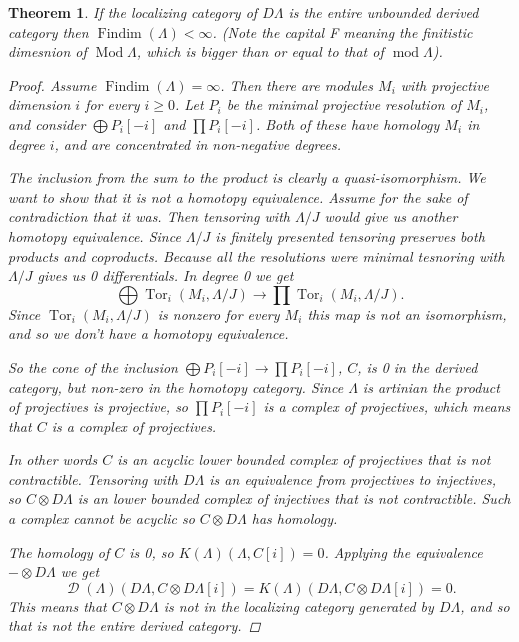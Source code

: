 \documentclass[11pt, a4paper, english]{article}
\newtheorem{theorem}{Theorem}[section]
\theoremstyle{definition}
\DeclareMathOperator{\Tor}{Tor}
\DeclareMathOperator{\Findim}{Findim}
\DeclareMathOperator{\Mod}{Mod}
\def\mod{\operatorname{mod}}
\DeclareMathOperator{\D}{\mathcal{D}}
\begin{document}
\begin{theorem}\cite[Theorem~4.3]{Rick19}\label{thm:injectives_generate_implies_FDC}
	If the localizing category of $D\Lambda$ is the entire unbounded derived category then $\Findim(\Lambda) < \infty$. (Note the capital F meaning the finitistic dimesnion of $\Mod\Lambda$, which is bigger than or equal to that of $\mod\Lambda$).
	
	\begin{proof}
		Assume $\Findim(\Lambda) = \infty$. Then there are modules $M_i$ with projective dimension $i$ for every $i \geq 0$. Let $P_i$ be the minimal projective resolution of $M_i$, and consider $\bigoplus P_i[-i]$ and $\prod P_i[-i]$. Both of these have homology $M_i$ in degree $i$, and are concentrated in non-negative degrees.
		
		The inclusion from the sum to the product is clearly a quasi-isomorphism. We want to show that it is not a homotopy equivalence. Assume for the sake of contradiction that it was. Then tensoring with $\Lambda/J$ would give us another homotopy equivalence. Since $\Lambda/J$ is finitely presented tensoring preserves both products and coproducts. Because all the resolutions were minimal tesnoring with $\Lambda/J$ gives us 0 differentials. In degree 0 we get $$\bigoplus \Tor_i(M_i, \Lambda/J) \to \prod \Tor_i(M_i, \Lambda/J) .$$
		Since $\Tor_i(M_i, \Lambda/J)$ is nonzero for every $M_i$ this map is not an isomorphism, and so we don't have a homotopy equivalence.
		
		So the cone of the inclusion $\bigoplus P_i[-i] \to \prod P_i[-i]$, $C$, is 0 in the derived category, but non-zero in the homotopy category. Since $\Lambda$ is artinian the product of projectives is projective\cite[Theorem~3.3]{Chase60}, so $\prod P_i[-i]$ is a complex of projectives, which means that $C$ is a complex of projectives. 
		
		In other words $C$ is an acyclic lower bounded complex of projectives that is not contractible. Tensoring with $D\Lambda$ is an equivalence from projectives to injectives, so $C\otimes D\Lambda$ is an lower bounded complex of injectives that is not contractible. Such a complex cannot be acyclic so $C\otimes D\Lambda$ has homology.
		
		The homology of $C$ is 0, so $K(\Lambda)(\Lambda, C[i]) = 0$. Applying the equivalence $-\otimes D\Lambda$ we get $$\D(\Lambda)(D\Lambda, C\otimes D\Lambda [i])=K(\Lambda)(D\Lambda, C\otimes D\Lambda [i])=0.$$ This means that $C\otimes D\Lambda$ is not in the localizing category generated by $D\Lambda$, and so that is not the entire derived category.
	\end{proof}
\end{theorem}
\end{document}
